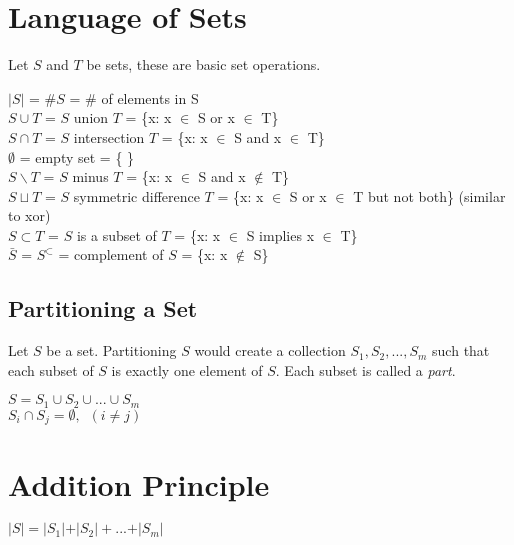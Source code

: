 \documentclass[12pt, letterpaper]{article}
\begin{document}
 
\maketitle

\section*{Language of Sets}

Let \(S\) and \(T\) be sets, these are basic set operations.
\begin{center}
  \( \vert S \vert\) = \#\( S\) = \# of elements in S \\
  \(S \cup T\) = \(S\) union \(T\) = \{x: x \(\in\) S or x \(\in\) T\} \\
  \(S \cap T\) = \(S\) intersection \(T\) = \{x: x \(\in\) S and x \(\in\) T\} \\
  \(\emptyset \) = empty set = \{ \} \\
  \(S \backslash T\) = \(S\) minus \(T\) = \{x: x \(\in\) S and x \(\notin\) T\} \\
  \(S \sqcup T\) = \(S\) symmetric difference \(T\) = \{x: x \(\in\) S or x \(\in\) T but not both\} (similar to xor) \\
  \(S \subset T\) = \(S\) is a subset of \(T\) = \{x: x \(\in\) S implies x \(\in\) T\} \\
  \(\bar{S}\) = \(S^{\subset}\) = complement of \(S\) = \{x: x \(\notin\) S\} \\
\end{center}

\subsection*{Partitioning a Set}
\indent Let \(S\) be a set. Partitioning \(S\) would create a collection \(S_1, S_2,...,S_m\) such that each subset of \(S\) is exactly one element of \(S\). Each subset is called a \textit{part}.

\begin{center}
  \(S = S_1 \cup S_2 \cup ... \cup S_m \) \\
  \(S_i \cap S_j = \emptyset, \,\,\, (i \neq j)\)
\end{center}

\pagebreak
\section*{Addition Principle}
\begin{center}
  \(\vert S \vert = \vert S_1 \vert + \vert S_2 \vert + ... + \vert S_m \vert\) \\
\end{center}
\end{document}
